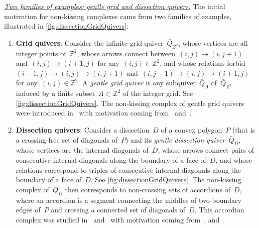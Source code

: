 \documentclass{amsart}
\theoremstyle{definition}
\newcommand{\Z}{\mathbb{Z}} %
\newcommand{\darkblue}{\color{darkblue}} %
\newcommand{\defn}[1]{\textsl{\darkblue #1}} %
\newcommand{\para}[1]{\medskip\noindent\uline{\textit{#1.}}} %
\newcommand{\quiver}{\bar Q} %
\begin{document}
\para{Two families of examples: gentle grid and dissection quivers}
%
The initial motivation for non-kissing complexes came from two families of examples, illustrated in \cref{fig:dissectionGridQuivers}:
\begin{enumerate}[(1)]
\item \textbf{Grid quivers}: Consider the infinite grid quiver~$\quiver_{Z^2}$, whose vertices are all integer points of~$\Z^2$, whose arrows connect between~$(i,j) \longrightarrow (i,j+1)$ and~$(i,j) \longrightarrow (i+1,j)$ for any~$(i,j) \in \Z^2$, and whose relations forbid~$(i-1,j) \longrightarrow (i,j) \longrightarrow (i,j+1)$ and~$(i,j-1) \longrightarrow (i,j) \longrightarrow (i+1,j)$ for any~$(i,j) \in \Z^2$. A \defn{gentle grid quiver} is any subquiver~$\quiver_A$ of~$\quiver_{Z^2}$ induced by a finite subset~$A \subset \Z^2$ of the integer grid. See \cref{fig:dissectionGridQuivers}. The non-kissing complex of gentle grid quivers were introduced in~\cite{McConville} with motivation coming from~\cite{PetersenPylyavskyySpeyer} and~\cite{SantosStumpWelker}. 

\smallskip
\item \textbf{Dissection quivers}: Consider a dissection~$D$ of a convex polygon~$P$ (that is a crossing-free set of diagonals of~$P$) and its \defn{gentle dissection quiver}~$\quiver_D$, whose vertices are the internal diagonals of~$D$, whose arrows connect pairs of consecutive internal diagonals along the boundary of a face of~$D$, and whose relations correspond to triples of consecutive internal diagonals along the boundary of a face of~$D$. See \cref{fig:dissectionGridQuivers}. The non-kissing complex of~$\quiver_D$ then corresponds to non-crossing sets of accordions of~$D$, where an accordion is a segment connecting the middles of two boundary edges of~$P$ and crossing a connected set of diagonals of~$D$. This accordion complex was studied in~\cite{GarverMcConville} and~\cite{MannevillePilaud-accordion} with motivation coming from~\cite{Baryshnikov}, and~\cite{Chapoton-quadrangulations}.
\end{enumerate}
\end{document}
